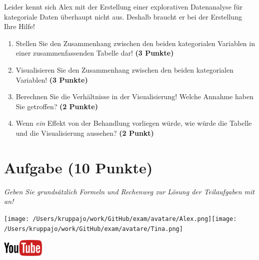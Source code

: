 \documentclass[a4paper, 9pt]{scrartcl}\usepackage[]{graphicx}\usepackage[]{xcolor}
\begin{document}
\vspace{2Ex}

Leider kennt sich Alex mit der Erstellung einer explorativen Datenanalyse für kategoriale Daten überhaupt nicht aus. Deshalb braucht er bei der Erstellung Ihre Hilfe!

\begin{enumerate}
\item Stellen Sie den Zusammenhang zwischen den beiden kategorialen Variablen in einer zusammenfassenden Tabelle dar! \textbf{(3 Punkte)}
\item Visualisieren Sie den Zusammenhang zwischen den beiden kategorialen Variablen! \textbf{(3 Punkte)}
\item Berechnen Sie die Verhältnisse in der Visualisierung! Welche Annahme haben Sie getroffen? \textbf{(2 Punkte)}
\item Wenn \textit{ein} Effekt von der Behandlung vorliegen würde, wie würde die Tabelle und die Visualisierung aussehen? \textbf{(2 Punkt)}
\end{enumerate} 
\clearpage

\section{Aufgabe \hfill (10 Punkte)}

\textit{Geben Sie grundsätzlich Formeln und Rechenweg zur Lösung der Teilaufgaben mit an!} \\[1Ex]
 

 
\begin{minipage}[t]{0.5\textwidth}
\texttt{[image: /Users/kruppajo/work/GitHub/exam/avatare/Alex.png]}\hspace{-4mm}\texttt{[image: /Users/kruppajo/work/GitHub/exam/avatare/Tina.png]}
\end{minipage}
\begin{minipage}[t]{0.5\textwidth}
\hfill
\href{https://youtu.be/Op-gjzASH9I}{\includegraphics[width = 2cm]{img/youtube}}
\end{minipage}
\vspace{1ex}
\end{document}
